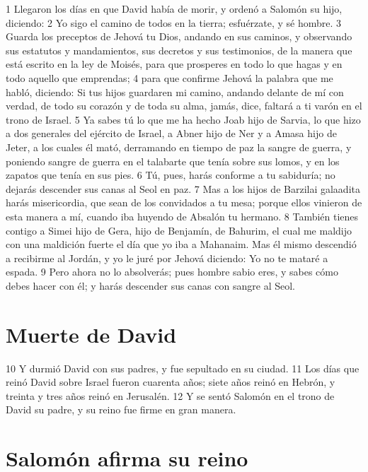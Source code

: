 1 Llegaron los días en que David había de morir, y ordenó a Salomón su hijo, diciendo:
2 Yo sigo el camino de todos en la tierra; esfuérzate, y sé hombre.
3 Guarda los preceptos de Jehová tu Dios, andando en sus caminos, y observando sus estatutos y mandamientos, sus decretos y sus testimonios, de la manera que está escrito en la ley de Moisés, para que prosperes en todo lo que hagas y en todo aquello que emprendas;
4 para que confirme Jehová la palabra que me habló, diciendo: Si tus hijos guardaren mi camino, andando delante de mí con verdad, de todo su corazón y de toda su alma, jamás, dice, faltará a ti varón en el trono de Israel.
5 Ya sabes tú lo que me ha hecho Joab hijo de Sarvia, lo que hizo a dos generales del ejército de Israel, a Abner hijo de Ner y a Amasa hijo de Jeter, a los cuales él mató, derramando en tiempo de paz la sangre de guerra, y poniendo sangre de guerra en el talabarte que tenía sobre sus lomos, y en los zapatos que tenía en sus pies.
6 Tú, pues, harás conforme a tu sabiduría; no dejarás descender sus canas al Seol en paz.
7 Mas a los hijos de Barzilai galaadita harás misericordia, que sean de los convidados a tu mesa; porque ellos vinieron de esta manera a mí, cuando iba huyendo de Absalón tu hermano.
8 También tienes contigo a Simei hijo de Gera, hijo de Benjamín, de Bahurim, el cual me maldijo con una maldición fuerte el día que yo iba a Mahanaim. Mas él mismo descendió a recibirme al Jordán, y yo le juré por Jehová diciendo: Yo no te mataré a espada. 
9 Pero ahora no lo absolverás; pues hombre sabio eres, y sabes cómo debes hacer con él; y harás descender sus canas con sangre al Seol.

\section*{Muerte de David}

10 Y durmió David con sus padres, y fue sepultado en su ciudad.
11 Los días que reinó David sobre Israel fueron cuarenta años; siete años reinó en Hebrón, y treinta y tres años reinó en Jerusalén. 
12 Y se sentó Salomón en el trono de David su padre, y su reino fue firme en gran manera.

\section*{Salomón afirma su reino}

